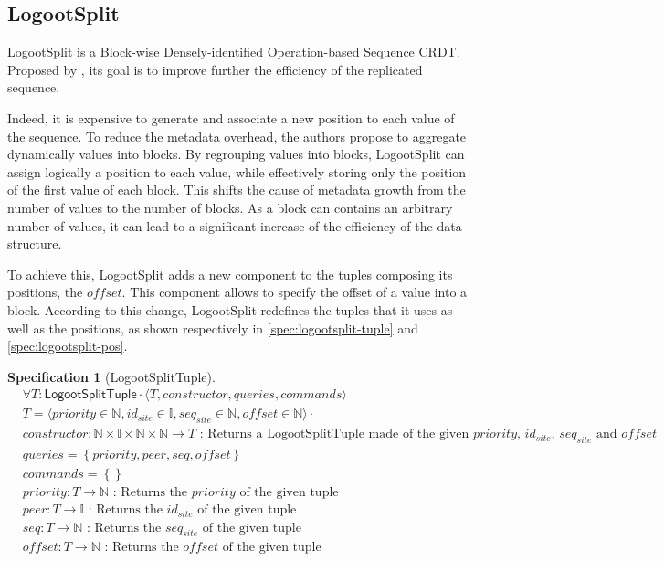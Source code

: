 \documentclass{article}
\newcommand{\commands}[1]{commands = \set{#1}}
\newcommand{\fnspec}[3]{#1: #2 \text{ : #3}}
\newcommand{\inbb}[1]{\in \mathbb{#1}}
\newcommand{\queries}[1]{queries = \set{#1}}
\newcommand{\set}[1]{\left\{#1\right\}} %
\newcommand{\spectuple}[1]{\tuple{#1, constructor, queries, commands}}
\newcommand{\tuple}[1]{\langle #1 \rangle}
\theoremstyle{definition}
\newcounter{note-counter}
\theoremstyle{definition}
\theoremstyle{definition}
\newcounter{specificationcounter}
\theoremstyle{definition}
\newtheorem{specification}[specificationcounter]{Specification}
\begin{document}
\subsection{LogootSplit \cite{AndreCollaborateCom2013}}

LogootSplit is a Block-wise Densely-identified Operation-based Sequence \ac{CRDT}.
Proposed by \textcite{AndreCollaborateCom2013}, its goal is to improve further the efficiency of the replicated sequence.

Indeed, it is expensive to generate and associate a new position to each value of the sequence.
To reduce the metadata overhead, the authors propose to aggregate dynamically values into blocks.
By regrouping values into blocks, LogootSplit can assign logically a position to each value, while effectively storing only the position of the first value of each block.
This shifts the cause of metadata growth from the number of values to the number of blocks.
As a block can contains an arbitrary number of values, it can lead to a significant increase of the efficiency of the data structure.

To achieve this, LogootSplit adds a new component to the tuples composing its positions, the $offset$.
This component allows to specify the offset of a value into a block.
According to this change, LogootSplit redefines the tuples that it uses as well as the positions, as shown respectively in \autoref{spec:logootsplit-tuple} and \autoref{spec:logootsplit-pos}.


\begin{specification}[LogootSplitTuple]
    \begin{align*}
    &\forall T: \mathsf{LogootSplitTuple} \cdot \spectuple{T}\\
    &T = \tuple{priority \inbb{N}, id_{site} \inbb{I}, seq_{site} \inbb{N}, offset \inbb{N}} \cdot\\
    &\fnspec{constructor}{\mathbb{N} \times \mathbb{I} \times \mathbb{N} \times \mathbb{N} \to T}{Returns a LogootSplitTuple made of the given $priority$, $id_{site}$, $seq_{site}$ and $offset$}\\
    &\queries{priority, peer, seq, offset}\\
    &\commands{}\\
    &\fnspec{priority}{T \to \mathbb{N}}{Returns the $priority$ of the given tuple}\\
    &\fnspec{peer}{T \to \mathbb{I}}{Returns the $id_{site}$ of the given tuple}\\
    &\fnspec{seq}{T \to \mathbb{N}}{Returns the $seq_{site}$ of the given tuple}\\
    &\fnspec{offset}{T \to \mathbb{N}}{Returns the $offset$ of the given tuple}
    \end{align*}
    \label{spec:logootsplit-tuple}
\end{specification}
\end{document}
